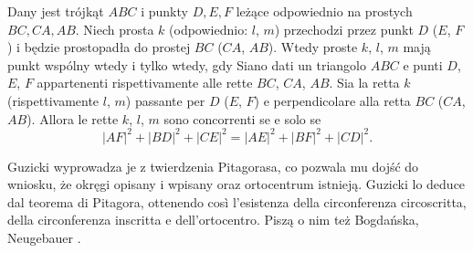 \begin{theorem}[Carnota]
%
\label{guzicki_6_13}%
	Dany jest trójkąt $ABC$ i punkty $D, E, F$ leżące odpowiednio na prostych $BC, CA, AB$. %
	Niech prosta $k$ (odpowiednio: $l$, $m$) przechodzi przez punkt $D$ ($E$, $F$) i będzie prostopadła do prostej $BC$ ($CA$, $AB$). %
	Wtedy proste $k$, $l$, $m$ mają punkt wspólny wtedy i tylko wtedy, gdy %
	Siano dati un triangolo $ABC$ e punti $D$, $E$, $F$ appartenenti rispettivamente alle rette $BC$, $CA$, $AB$. %
	Sia la retta $k$ (rispettivamente $l$, $m$) passante per $D$ ($E$, $F$) e perpendicolare alla retta $BC$ ($CA$, $AB$). %
	Allora le rette $k$, $l$, $m$ sono concorrenti se e solo se %
	\begin{equation}
		|AF|^2 + |BD|^2 + |CE|^2 = |AE|^2 + |BF|^2 + |CD|^2.
	\end{equation}
\end{theorem}

Guzicki \cite[s. 176]{guzicki_2021} wyprowadza je z twierdzenia Pitagorasa, co pozwala mu dojść do wniosku, że okręgi opisany i wpisany oraz ortocentrum istnieją. %
Guzicki \cite[p.~176]{guzicki_2021} lo deduce dal teorema di Pitagora, ottenendo così l'esistenza della circonferenza circoscritta, della circonferenza inscritta e dell'ortocentro. %
Piszą o nim też Bogdańska, Neugebauer \cite[s. 118]{neugebauer_2018}.


%